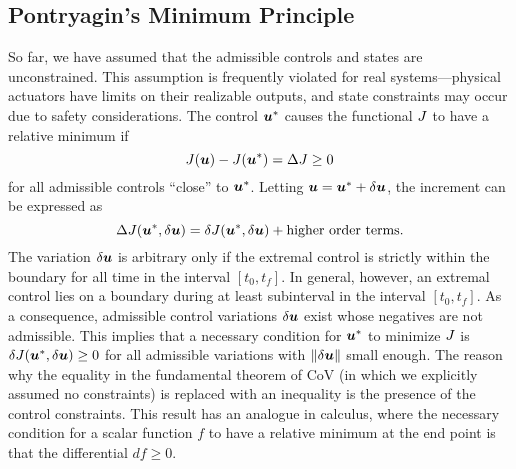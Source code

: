 \subsection{Pontryagin's Minimum Principle}

So far, we have assumed that the admissible controls and states are unconstrained. This assumption is frequently violated for real systems---physical actuators have limits on their realizable outputs, and state constraints may occur due to safety considerations. The control $\bm{u}^*$ causes the functional $J$ to have a relative minimum if
\begin{equation}
    J(\bm{u}) - J(\bm{u}^*) = \Delta J \geq 0
\end{equation}
for all admissible controls ``close'' to $\bm{u}^*$. Letting $\bm{u} = \bm{u}^* + \delta \bm{u}$, the increment can be expressed as
\begin{equation}
    \Delta J(\bm{u}^*,\delta\bm{u}) = \delta J(\bm{u}^*,\delta \bm{u}) + \text{higher order terms}.
\end{equation}
The variation $\delta \bm{u}$ is arbitrary only if the extremal control is strictly within the boundary for all time in the interval $[t_0,t_f]$. In general, however, an extremal control lies on a boundary during at least subinterval in the interval $[t_0,t_f]$.
As a consequence, admissible control variations $\delta \bm{u}$ exist whose negatives are not admissible. This implies that a necessary condition for $\bm{u}^*$ to minimize $J$ is $\delta J(\bm{u}^*, \delta \bm{u}) \geq 0$ for all admissible variations with $\|\delta \bm{u}\|$ small enough. The reason why the equality in the fundamental theorem of CoV (in which we explicitly assumed no constraints) is replaced with an inequality is the presence of the control constraints. This result has an analogue in calculus, where the necessary condition for a scalar function $f$ to have a relative minimum at the end point is that the differential $df \geq 0$.

